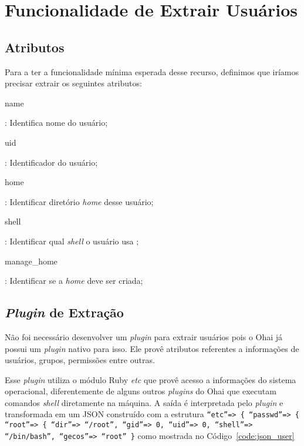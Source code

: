 \section{Funcionalidade de Extrair Usuários}
\label{sec:users}

\subsection{Atributos}

Para a ter a funcionalidade mínima esperada desse recurso, definimos que iríamos precisar
extrair os seguintes atributos:


\begin{itemize}
    {\itshape\item name}: Identifica nome do usuário;
    {\itshape\item uid}: Identificador do usuário;
    {\itshape\item home}: Identificar diretório \textit{home} desse usuário;
    {\itshape\item shell}: Identificar qual \textit{shell} o usuário usa ;
    {\itshape\item manage\_home}: Identificar se a \textit{home} deve ser criada;
\end{itemize}

\subsection{\textit{Plugin} de Extração}
Não foi necessário desenvolver um \textit{plugin} para extrair usuários pois o Ohai
já possui um \textit{plugin} nativo para isso. Ele provê atributos referentes
a informações de usuários, grupos, permissões entre outras.

Esse \textit{plugin} utiliza o módulo Ruby \textit{etc} que provê acesso a informações
do sistema operacional, diferentemente de alguns outros \textit{plugins} do Ohai
que executam comandos \textit{shell} diretamente na máquina. A saída é interpretada
pelo \textit{plugin} e transformada em um JSON construído com a estrutura
\texttt{``etc''=> \{ ``passwd''=> \{ ``root''=> \{ ``dir''=> ``/root'', ``gid''=> 0, ``uid''=> 0, ``shell''=> ``/bin/bash'', ``gecos''=> ``root'' \}} 
como mostrada no Código~\ref{code:json_user}

\noindent\begin{minipage}{\textwidth}
  \lstset{style=shell}
  
\end{minipage}\hfill

